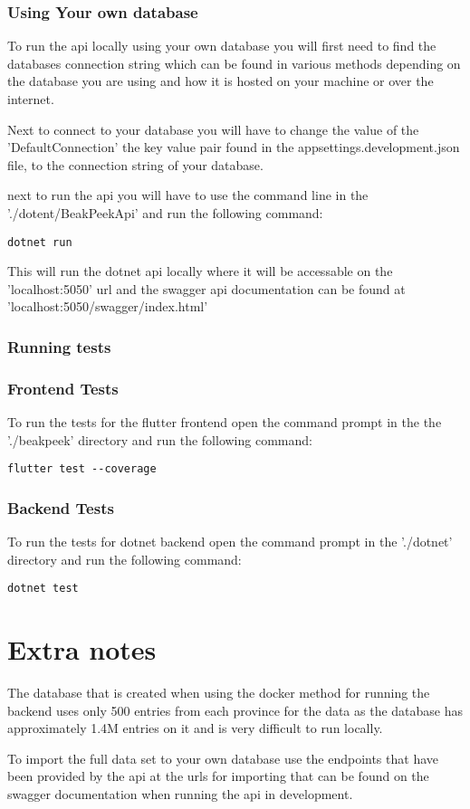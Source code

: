 \documentclass{article}
\begin{document}
\subsubsection{Using Your own database}

To run the api locally using your own database you will first need to find the
databases connection string which can be found in various methods depending on
the database you are using and how it is hosted on your machine or over the
internet.

Next to connect to your database you will have to change the value of the 'DefaultConnection'
the key value pair found in the appsettings.development.json file, to the
connection string of your database.

next to run the api you will have to use the command line in the './dotent/BeakPeekApi'
and run the following command:

\begin{lstlisting}
dotnet run
\end{lstlisting}

This will run the dotnet api locally where it will be accessable on the 'localhost:5050'
url and the swagger api documentation can be found at 'localhost:5050/swagger/index.html'

\subsubsection{Running tests}

\subsubsection{Frontend Tests}

To run the tests for the flutter frontend open the command prompt in the the
'./beakpeek' directory and run the following command:

\begin{lstlisting}
flutter test --coverage
\end{lstlisting}

\subsubsection{Backend Tests}

To run the tests for dotnet backend open the command prompt in the './dotnet'
directory and run the following command:

\begin{lstlisting}
dotnet test
\end{lstlisting}

\section{Extra notes}

The database that is created when using the docker method for running the
backend uses only 500 entries from each province for the data as the database
has approximately 1.4M entries on it and is very difficult to run locally.

To import the full data set to your own database use the endpoints that have
been provided by the api at the urls for importing that can be found on the
swagger documentation when running the api in development.
\end{document}
